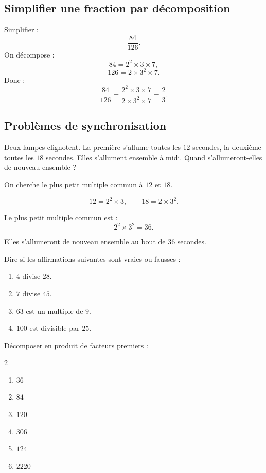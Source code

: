 \documentclass[11pt,a4paper]{article}
\newcounter{exercice}
\begin{document}
\subsection{Simplifier une fraction par décomposition}

\begin{exemple}
Simplifier :
\[
\frac{84}{126}.
\]
On décompose :
\[
84=2^2\times3\times7,
\]
\[
126=2\times3^2\times7.
\]
Donc :
\[
\frac{84}{126}
=
\frac{2^2\times3\times7}{2\times3^2\times7}
=
\frac{2}{3}.
\]
\end{exemple}

\subsection{Problèmes de synchronisation}

\begin{exemple}
Deux lampes clignotent. La première s'allume toutes les $12$ secondes, la deuxième toutes les $18$ secondes. Elles s'allument ensemble à midi. Quand s'allumeront-elles de nouveau ensemble ?

On cherche le plus petit multiple commun à $12$ et $18$.

\[
12=2^2\times3,
\qquad
18=2\times3^2.
\]

Le plus petit multiple commun est :
\[
2^2\times3^2=36.
\]

Elles s'allumeront de nouveau ensemble au bout de $36$ secondes.
\end{exemple}

\begin{exercice}
Dire si les affirmations suivantes sont vraies ou fausses :
\begin{enumerate}[label=\alph*)]
  \item $4$ divise $28$.
  \item $7$ divise $45$.
  \item $63$ est un multiple de $9$.
  \item $100$ est divisible par $25$.
\end{enumerate}
\end{exercice}

\begin{exercice}[Méthode]
Décomposer en produit de facteurs premiers :
\begin{multicols}{2}
\begin{enumerate}[label=\alph*)]
  \item $36$
  \item $84$
  \item $120$
  \item $306$
  \item $124$
  \item $2220$
\end{enumerate}
\end{multicols}
\end{exercice}
\end{document}
